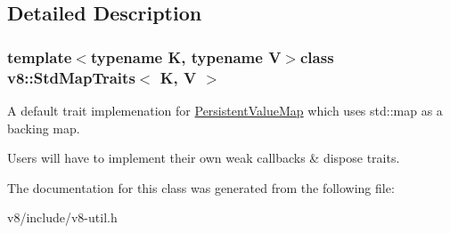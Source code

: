 \subsection{Detailed Description}
\subsubsection*{template$<$typename K, typename V$>$class v8\-::\-Std\-Map\-Traits$<$ K, V $>$}

A default trait implemenation for \hyperlink{classv8_1_1PersistentValueMap}{Persistent\-Value\-Map} which uses std\-::map as a backing map.

Users will have to implement their own weak callbacks \& dispose traits. 

The documentation for this class was generated from the following file\-:\begin{DoxyCompactItemize}
\item 
v8/include/v8-\/util.\-h\end{DoxyCompactItemize}

